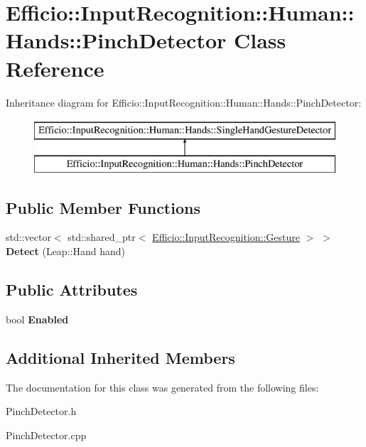 \hypertarget{class_efficio_1_1_input_recognition_1_1_human_1_1_hands_1_1_pinch_detector}{}\section{Efficio\+:\+:Input\+Recognition\+:\+:Human\+:\+:Hands\+:\+:Pinch\+Detector Class Reference}
\label{class_efficio_1_1_input_recognition_1_1_human_1_1_hands_1_1_pinch_detector}
Inheritance diagram for Efficio\+:\+:Input\+Recognition\+:\+:Human\+:\+:Hands\+:\+:Pinch\+Detector\+:\begin{figure}[H]
\begin{center}
\leavevmode
\includegraphics[height=2.000000cm]{class_efficio_1_1_input_recognition_1_1_human_1_1_hands_1_1_pinch_detector}
\end{center}
\end{figure}
\subsection*{Public Member Functions}
\begin{DoxyCompactItemize}
\item 
\hypertarget{class_efficio_1_1_input_recognition_1_1_human_1_1_hands_1_1_pinch_detector_a2488f7f3594f68d745da77364d025eef}{}\label{class_efficio_1_1_input_recognition_1_1_human_1_1_hands_1_1_pinch_detector_a2488f7f3594f68d745da77364d025eef} 
std\+::vector$<$ std\+::shared\+\_\+ptr$<$ \hyperlink{class_efficio_1_1_input_recognition_1_1_gesture}{Efficio\+::\+Input\+Recognition\+::\+Gesture} $>$ $>$ {\bfseries Detect} (Leap\+::\+Hand hand)
\end{DoxyCompactItemize}
\subsection*{Public Attributes}
\begin{DoxyCompactItemize}
\item 
\hypertarget{class_efficio_1_1_input_recognition_1_1_human_1_1_hands_1_1_pinch_detector_ace7cbaf0cc98103be15dfdc621a49f3f}{}\label{class_efficio_1_1_input_recognition_1_1_human_1_1_hands_1_1_pinch_detector_ace7cbaf0cc98103be15dfdc621a49f3f} 
bool {\bfseries Enabled}
\end{DoxyCompactItemize}
\subsection*{Additional Inherited Members}


The documentation for this class was generated from the following files\+:\begin{DoxyCompactItemize}
\item 
Pinch\+Detector.\+h\item 
Pinch\+Detector.\+cpp\end{DoxyCompactItemize}

